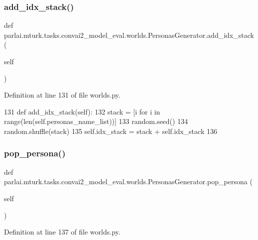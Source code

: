 \subsubsection{\texorpdfstring{add\+\_\+idx\+\_\+stack()}{add\_idx\_stack()}}
{\footnotesize\ttfamily def parlai.\+mturk.\+tasks.\+convai2\+\_\+model\+\_\+eval.\+worlds.\+Personas\+Generator.\+add\+\_\+idx\+\_\+stack (\begin{DoxyParamCaption}\item[{}]{self }\end{DoxyParamCaption})}



Definition at line 131 of file worlds.\+py.


\begin{DoxyCode}
131     \textcolor{keyword}{def }add\_idx\_stack(self):
132         stack = [i \textcolor{keywordflow}{for} i \textcolor{keywordflow}{in} range(len(self.personas\_name\_list))]
133         random.seed()
134         random.shuffle(stack)
135         self.idx\_stack = stack + self.idx\_stack
136 
\end{DoxyCode}
\mbox{\label{classparlai_1_1mturk_1_1tasks_1_1convai2__model__eval_1_1worlds_1_1PersonasGenerator_aaed4bad803d218c5a11ffabae4fd4e66}} 
\subsubsection{\texorpdfstring{pop\+\_\+persona()}{pop\_persona()}}
{\footnotesize\ttfamily def parlai.\+mturk.\+tasks.\+convai2\+\_\+model\+\_\+eval.\+worlds.\+Personas\+Generator.\+pop\+\_\+persona (\begin{DoxyParamCaption}\item[{}]{self }\end{DoxyParamCaption})}



Definition at line 137 of file worlds.\+py.


